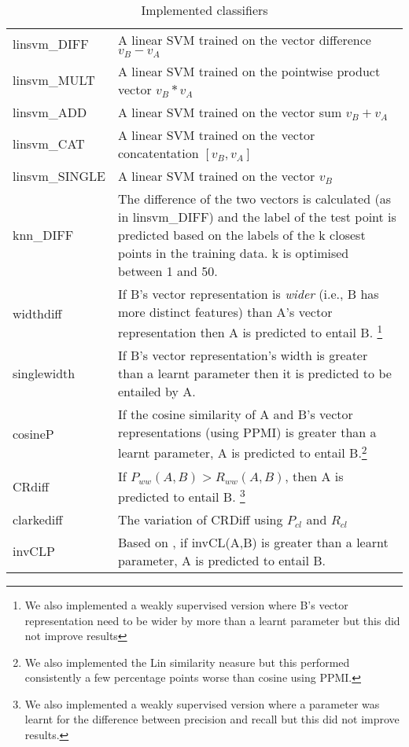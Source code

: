 \documentclass[11pt]{article}
\begin{document}
\begin{table}[ht]
\centering
\begin{tabular}{p{2cm} p{5.5cm}}
linsvm\_DIFF&A linear SVM trained on the vector difference $v_B - v_A$\\
linsvm\_MULT&A linear SVM trained on the pointwise product vector $v_B * v_A$\\
linsvm\_ADD&A linear SVM trained on the vector sum $v_B + v_A$\\
linsvm\_CAT&A linear SVM trained on the vector concatentation $[v_B,v_A]$\\
linsvm\_SINGLE&A linear SVM trained on the vector $v_B$\\
knn\_DIFF&The difference of the two vectors is calculated (as in linsvm\_DIFF) and the label of the test point is predicted based on the labels of the k closest points in the training data. k is optimised between 1 and 50.\\
widthdiff&If B's vector representation is \textit{wider} (i.e., B has more distinct features) than A's vector representation then A is predicted to entail B. \footnote{We also implemented a weakly supervised version where B's vector representation need to be wider by more than a learnt parameter but this did not improve results}\\
singlewidth&If B's vector representation's width is greater than a learnt parameter then it is predicted to be entailed by A.\\
cosineP&If the cosine similarity of A and B's vector representations (using PPMI) is greater than a learnt parameter, A is predicted to entail B.\footnote{We also implemented the Lin similarity neasure \cite{Lin1998} but this performed consistently a few percentage points worse than cosine using PPMI.} \\
CRdiff&If $P_{ww}(A,B) > R_{ww}(A,B)$, then A is predicted to entail B.  \footnote{We also implemented a weakly supervised version where a parameter was learnt for the difference between precision and recall but this did not improve results.}\\
clarkediff&The \cite{Clarke2007} variation of CRDiff using $P_{cl}$ and $R_{cl}$\\
invCLP&Based on \cite{Lenci2012}, if invCL(A,B) is greater than a learnt parameter, A is predicted to entail B.\\
\end{tabular}
\caption{Implemented classifiers}
\label{table:classifiers}
\end{table}
\end{document}
